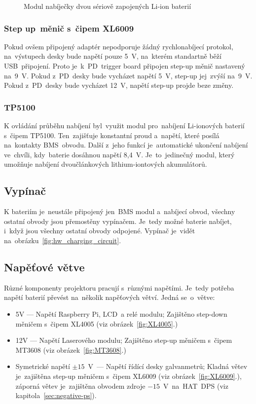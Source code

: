 \begin{figure}[htb]
\begin{minipage}{0.3\textwidth}
    \caption{\label{fig:TP5100} Modul nabíječky dvou sériově zapojených Li-ion baterií~\cite{laskakit-TP5100}}
  \end{minipage}
\end{figure}

\subsubsection{Step up~měnič s~čipem XL6009}
Pokud ovšem připojený adaptér nepodporuje žádný rychlonabíjecí protokol, na~výstupech desky bude napětí pouze 5~V, na~kterém standartně běží USB~připojení. Proto je~k~PD~trigger board připojen step-up měnič nastavený na~9~V.
Pokud z~PD~desky bude vycházet napětí 5~V, step-up jej~zvýší na~9~V. Pokud z~PD~desky bude vycházet 12~V, napětí step-up projde beze změny.

\subsubsection{TP5100}
K ovládání průběhu nabíjení byl~využit modul pro~nabíjení Li-ionových baterií s~čipem TP5100. Ten~zajišťuje konstantní proud a~napětí, které posílá na~kontakty BMS~obvodu. Další z~jeho funkcí je~automatické ukončení nabíjení ve~chvíli, kdy~baterie dosáhnou napětí 8,4~V. Je~to~jedinečný modul, který umožňuje nabíjení dvoučlánkových lithium-iontových akumulátorů.

\subsection{Vypínač}
K bateriím je~neustále připojený jen~BMS modul a~nabíjecí obvod, všechny ostatní obvody jsou přemostěny vypínačem. Je~tedy možné baterie nabíjet, i~když jsou všechny ostatní obvody odpojené. Vypínač je~vidět na~obrázku~\ref{fig:hw_charging_circuit}.

\subsection{Napěťové větve}
Různé komponenty projektoru pracují s~různými napětími. Je~tedy potřeba napětí baterií převést na~několik napěťových větví. Jedná se~o~větve:

\begin{itemize}
  \item 5V --- Napětí Raspberry Pi, LCD~a relé modulu; Zajištěno step-down měničem s~čipem XL4005 (viz obrázek~\ref{fig:XL4005}.)
  \item 12V --- Napětí Laserového modulu; Zajištěno step-up měničem s~čipem MT3608 (viz obrázek~\ref{fig:MT3608}.)
  \item Symetrické napětí $\pm{}15$~V~--- Napětí řídící desky galvanmetrů; Kladná větev je~zajištěna step-up měničem s~čipem XL6009 (viz obrázek~\ref{fig:XL6009}.), záporná větev je~zajištěna obvodem zdroje $-15$~V~na~HAT~DPS (viz kapitola~\ref{sec:negative-ps}).
\end{itemize}


